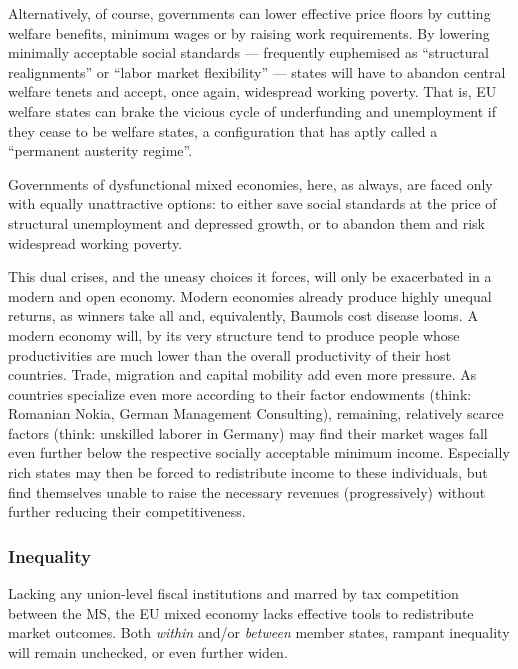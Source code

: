 \documentclass[11pt,a4paper,oneside,openright]{article}
\begin{document}
Alternatively, of course, governments can lower effective price floors by cutting welfare benefits, minimum wages or by raising work requirements. By lowering minimally acceptable social standards --- frequently euphemised as ``structural realignments'' or ``labor market flexibility'' --- states will have to abandon central welfare tenets and accept, once again, widespread working poverty. %
That is, \gls{EU} welfare states can brake the vicious cycle of underfunding and unemployment if they cease to be welfare states, a configuration that \cite{Streeck2010c} has aptly called a ``permanent austerity regime''. %

Governments of dysfunctional mixed economies, here, as always, are faced only with equally unattractive options: to either save social standards at the price of structural unemployment and depressed growth, or to abandon them and risk widespread working poverty.

This dual crises, and the uneasy choices it forces, will only be exacerbated in a modern and open economy. Modern economies already produce highly unequal returns, as winners take all and, equivalently, Baumols cost disease looms. A modern economy will, by its very structure tend to produce people whose productivities are much lower than the overall productivity of their host countries. %
Trade, migration and capital mobility add even more pressure. As countries specialize even more according to their factor endowments (think: Romanian Nokia, German Management Consulting), remaining, relatively scarce factors (think: unskilled laborer in Germany) may find their market wages fall even further below the respective socially acceptable minimum income. Especially rich states may then be forced to redistribute income to these individuals, but find themselves unable to raise the necessary revenues (progressively) without further reducing their competitiveness. 


\subsubsection{Inequality} Lacking any union-level fiscal institutions and marred by tax competition between the \gls{MS}, the \gls{EU} mixed economy lacks effective tools to redistribute market outcomes. Both \emph{within} and/or \emph{between} member states, rampant inequality will remain unchecked, or even further widen.
\end{document}
